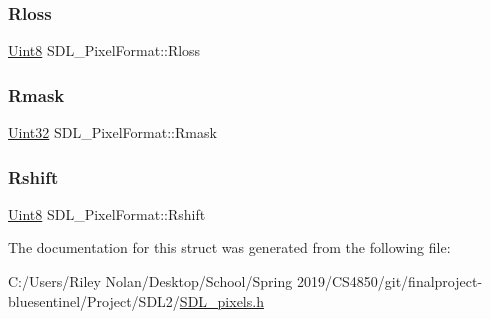 \mbox{\label{struct_s_d_l___pixel_format_a9994b4ed87a2551253aebfa191db8424}} 
\subsubsection{\texorpdfstring{Rloss}{Rloss}}
{\footnotesize\ttfamily \mbox{\hyperlink{_s_d_l__stdinc_8h_a2944638813a090aa23e62f4da842c3e2}{Uint8}} S\+D\+L\+\_\+\+Pixel\+Format\+::\+Rloss}

\mbox{\label{struct_s_d_l___pixel_format_a35e5793f6e9c356aec2d130167174946}} 
\subsubsection{\texorpdfstring{Rmask}{Rmask}}
{\footnotesize\ttfamily \mbox{\hyperlink{_s_d_l__stdinc_8h_add440eff171ea5f55cb00c4a9ab8672d}{Uint32}} S\+D\+L\+\_\+\+Pixel\+Format\+::\+Rmask}

\mbox{\label{struct_s_d_l___pixel_format_abfdec7b9ee2ee39db630f4022e4e0daa}} 
\subsubsection{\texorpdfstring{Rshift}{Rshift}}
{\footnotesize\ttfamily \mbox{\hyperlink{_s_d_l__stdinc_8h_a2944638813a090aa23e62f4da842c3e2}{Uint8}} S\+D\+L\+\_\+\+Pixel\+Format\+::\+Rshift}



The documentation for this struct was generated from the following file\+:\begin{DoxyCompactItemize}
\item 
C\+:/\+Users/\+Riley Nolan/\+Desktop/\+School/\+Spring 2019/\+C\+S4850/git/finalproject-\/bluesentinel/\+Project/\+S\+D\+L2/\mbox{\hyperlink{_s_d_l__pixels_8h}{S\+D\+L\+\_\+pixels.\+h}}\end{DoxyCompactItemize}
